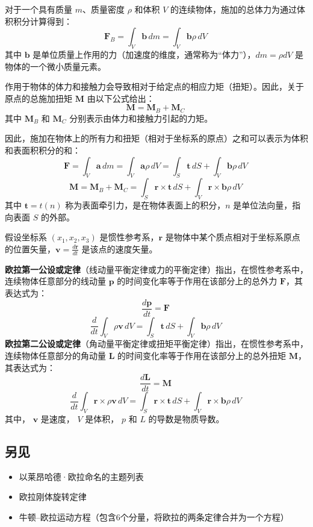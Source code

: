 对于一个具有质量 \( m \)、质量密度 \( \rho \) 和体积 \( V \) 的连续物体，施加的总体力为通过体积积分计算得到：
\[
\mathbf{F}_B = \int_V \mathbf{b} \, dm = \int_V \mathbf{b} \rho \, dV~
\]
其中 \( \mathbf{b} \) 是单位质量上作用的力（加速度的维度，通常称为“体力”），\( dm = \rho dV \) 是物体的一个微小质量元素。

作用于物体的体力和接触力会导致相对于给定点的相应力矩（扭矩）。因此，关于原点的总施加扭矩 \( \mathbf{M} \) 由以下公式给出：
\[
\mathbf{M} = \mathbf{M}_B + \mathbf{M}_C~
\]
其中 \( \mathbf{M}_B \) 和 \( \mathbf{M}_C \) 分别表示由体力和接触力引起的力矩。

因此，施加在物体上的所有力和扭矩（相对于坐标系的原点）之和可以表示为体积和表面积积分的和：
\[
\mathbf{F} = \int_V \mathbf{a} \, dm = \int_V \mathbf{a} \rho \, dV = \int_S \mathbf{t} \, dS + \int_V \mathbf{b} \rho \, dV~
\]
\[
\mathbf{M} = \mathbf{M}_B + \mathbf{M}_C = \int_S \mathbf{r} \times \mathbf{t} \, dS + \int_V \mathbf{r} \times \mathbf{b} \rho \, dV~
\]
其中 \( \mathbf{t} = t(n) \) 称为表面牵引力，是在物体表面上的积分，\( n \) 是单位法向量，指向表面 \( S \) 的外部。

假设坐标系 \( (x_1, x_2, x_3) \) 是惯性参考系，\( \mathbf{r} \) 是物体中某个质点相对于坐标系原点的位置矢量，\( \mathbf{v} = \frac{d\mathbf{r}}{dt} \) 是该点的速度矢量。

\textbf{欧拉第一公设或定律}（线动量平衡定律或力的平衡定律）指出，在惯性参考系中，连续物体任意部分的线动量 \( \mathbf{p} \) 的时间变化率等于作用在该部分上的总外力 \( \mathbf{F} \)，其表达式为：
\[
\frac{d\mathbf{p}}{dt} = \mathbf{F}~
\]
\[
\frac{d}{dt} \int_V \rho \mathbf{v} \, dV = \int_S \mathbf{t} \, dS + \int_V \mathbf{b} \rho \, dV~
\]
\textbf{欧拉第二公设或定律}（角动量平衡定律或扭矩平衡定律）指出，在惯性参考系中，连续物体任意部分的角动量 \( \mathbf{L} \) 的时间变化率等于作用在该部分上的总外扭矩 \( \mathbf{M} \)，其表达式为：
\[
\frac{d\mathbf{L}}{dt} = \mathbf{M}~
\]
\[
\frac{d}{dt} \int_V \mathbf{r} \times \rho \mathbf{v} \, dV = \int_S \mathbf{r} \times \mathbf{t} \, dS + \int_V \mathbf{r} \times \mathbf{b} \rho \, dV~
\]
其中，  \( \mathbf{v} \) 是速度，  \( V \) 是体积，  \( p \) 和 \( L \) 的导数是物质导数。
\subsection{另见}  
\begin{itemize}
\item 以莱昂哈德·欧拉命名的主题列表  
\item 欧拉刚体旋转定律  
\item 牛顿–欧拉运动方程（包含6个分量，将欧拉的两条定律合并为一个方程）
\end{itemize}
